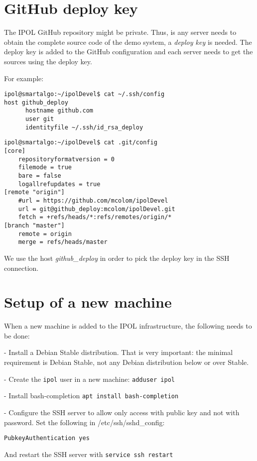 \documentclass[a4paper,12pt]{article}
\begin{document}
\section{GitHub deploy key}
The IPOL GitHub repository might be private. Thus, is any server needs to obtain the complete source code of the demo system, a \emph{deploy key} is needed. The deploy key is added to the GitHub configuration and each server needs to get the sources using the deploy key.

For example:

\begin{verbatim}
ipol@smartalgo:~/ipolDevel$ cat ~/.ssh/config
host github_deploy
      hostname github.com
      user git
      identityfile ~/.ssh/id_rsa_deploy
\end{verbatim}

\vspace{0.15cm}

\begin{verbatim}
ipol@smartalgo:~/ipolDevel$ cat .git/config
[core]
	repositoryformatversion = 0
	filemode = true
	bare = false
	logallrefupdates = true
[remote "origin"]
	#url = https://github.com/mcolom/ipolDevel
	url = git@github_deploy:mcolom/ipolDevel.git
	fetch = +refs/heads/*:refs/remotes/origin/*
[branch "master"]
	remote = origin
	merge = refs/heads/master
\end{verbatim}

We use the host \emph{github\_deploy} in order to pick the deploy key in the SSH connection.

\section{Setup of a new machine}
When a new machine is added to the IPOL infrastructure, the following needs to be done:

- Install a Debian Stable distribution. That is very important: the minimal requirement is Debian Stable, not any Debian distribution below or over Stable.

- Create the {\tt ipol} user in a new machine: {\tt adduser ipol}

- Install bash-completion {\tt apt install bash-completion}

- Configure the SSH server to allow only access with public key and not with password. Set the following in /etc/ssh/sshd\_config:

{\tt PubkeyAuthentication yes}

And restart the SSH server with {\tt service ssh restart}
\end{document}
